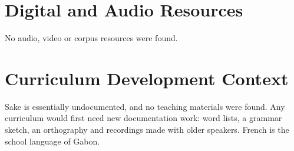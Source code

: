 \documentclass[12pt]{article}
\begin{document}
\section{Digital and Audio Resources}
No audio, video or corpus resources were found.

\section{Curriculum Development Context}
Sake is essentially undocumented, and no teaching materials were found. Any curriculum would first need new documentation work: word lists, a grammar sketch, an orthography and recordings made with older speakers. French is the school language of Gabon.
\end{document}
